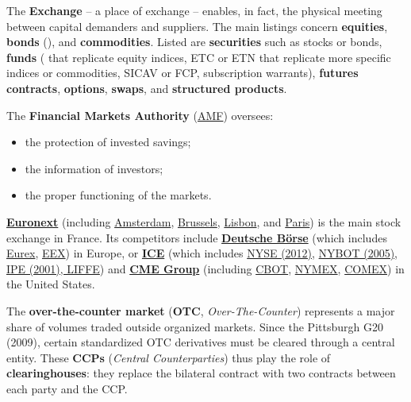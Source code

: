 \def\scaleBS{.95}

\begin{f}
	
The \textbf{Exchange} – a place of exchange – enables, in fact, the physical meeting between capital demanders and suppliers.
The main listings concern \textbf{equities}, \textbf{bonds} (), and \textbf{commodities}.
Listed are \textbf{securities} such as stocks or bonds, \textbf{funds} ( that replicate equity indices, ETC or ETN that replicate more specific indices or commodities, SICAV or FCP, subscription warrants), \textbf{futures contracts}, \textbf{options}, \textbf{swaps}, and \textbf{structured products}.

The \textbf{Financial Markets Authority} (\href{https://www.amf-france.org/fr}{AMF}) oversees:
\begin{itemize}
	\item the protection of invested savings; 
	\item the information of investors; 
	\item the proper functioning of the markets.
\end{itemize}

\textbf{\href{https://www.euronext.com/fr}{Euronext}} (including
\href{https://www.euronext.com/en/markets/amsterdam}{Amsterdam}, 
\href{https://www.euronext.com/en/markets/brussels}{Brussels}, 
\href{https://www.euronext.com/en/markets/lisbon}{Lisbon}, 
and \href{https://www.euronext.com/en/markets/paris}{Paris}) is the main stock exchange in France.
%
Its competitors include \textbf{\href{https://www.deutsche-boerse.com/dbg-en/}{Deutsche Börse}} 
(which includes \href{https://www.eurex.com/}{Eurex}, 
\href{https://www.eex.com/en/}{EEX}) in Europe,
%
or \textbf{\href{https://www.ice.com/}{ICE}} (which includes
\href{https://www.nyse.com/index}{NYSE (2012)}, 
\href{https://www.ice.com/about/history}{NYBOT (2005)}, 
\href{https://www.ice.com/futures-europe}{IPE (2001), LIFFE})
%
and \textbf{\href{https://www.cmegroup.com/}{CME Group}} (including
\href{https://www.cmegroup.com/company/cbot.html}{CBOT}, 
\href{https://www.cmegroup.com/company/nymex.html}{NYMEX}, 
\href{https://www.cmegroup.com/company/comex.html}{COMEX}) in the United States.

The \textbf{over-the-counter market} (\textbf{OTC}, \textit{Over-The-Counter}) represents a major share of volumes traded outside organized markets.
Since the Pittsburgh G20 (2009), certain standardized OTC derivatives must be cleared through a central entity.
These \textbf{CCPs} (\textit{Central Counterparties}) thus play the role of \textbf{clearinghouses}: they replace the bilateral contract with two contracts between each party and the CCP.


\end{f}

